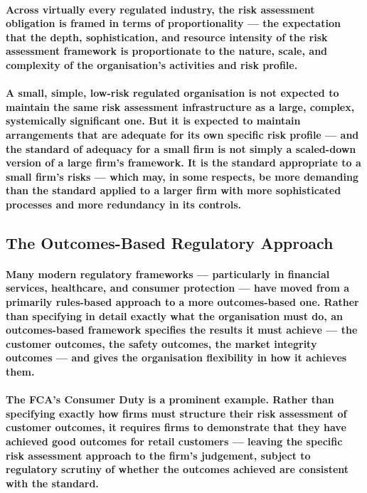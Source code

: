 \paragraph{Across virtually every regulated industry, the risk assessment obligation is framed in terms of proportionality — the expectation that the depth, sophistication, and resource intensity of the risk assessment framework is proportionate to the nature, scale, and complexity of the organisation's activities and risk profile.}
\paragraph{A small, simple, low-risk regulated organisation is not expected to maintain the same risk assessment infrastructure as a large, complex, systemically significant one. But it is expected to maintain arrangements that are adequate for its own specific risk profile — and the standard of adequacy for a small firm is not simply a scaled-down version of a large firm's framework. It is the standard appropriate to a small firm's risks — which may, in some respects, be more demanding than the standard applied to a larger firm with more sophisticated processes and more redundancy in its controls.}

\subsection{The Outcomes-Based Regulatory Approach}
\paragraph{Many modern regulatory frameworks — particularly in financial services, healthcare, and consumer protection — have moved from a primarily rules-based approach to a more outcomes-based one. Rather than specifying in detail exactly what the organisation must do, an outcomes-based framework specifies the results it must achieve — the customer outcomes, the safety outcomes, the market integrity outcomes — and gives the organisation flexibility in how it achieves them.}
\paragraph{The FCA's Consumer Duty is a prominent example. Rather than specifying exactly how firms must structure their risk assessment of customer outcomes, it requires firms to demonstrate that they have achieved good outcomes for retail customers — leaving the specific risk assessment approach to the firm's judgement, subject to regulatory scrutiny of whether the outcomes achieved are consistent with the standard.}
